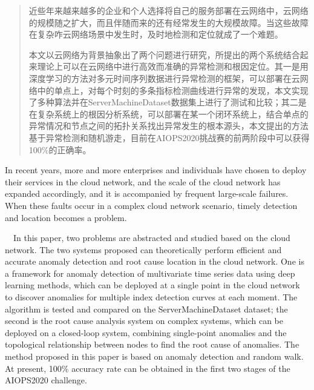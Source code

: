 

\begin{abstract}
  近些年来越来越多的企业和个人选择将自己的服务部署在云网络中，云网络的规模随之扩大，而且伴随而来的还有经常发生的大规模故障。当这些故障在复杂咋云网络场景中发生时，及时地检测和定位就成了一个难题。

  本文以云网络为背景抽象出了两个问题进行研究，所提出的两个系统结合起来理论上可以在云网络中进行高效而准确的异常检测和根因定位。其一是用深度学习的方法对多元时间序列数据进行异常检测的框架，可以部署在云网络中的单点上，对每个时刻的多条指标检测曲线进行异常的发现，本文实现了多种算法并在ServerMachineDataset\cite{su2019robust}数据集上进行了测试和比较；其二是在复杂系统上的根因分析系统，可以部署在某一个闭环系统上，结合单点的异常情况和节点之间的拓扑关系找出异常发生的根本源头，本文提出的方法基于异常检测和随机游走，目前在AIOPS2020挑战赛的前两阶段中可以获得100\%的正确率。

\end{abstract}

\begin{abstract*}
  In recent years, more and more enterprises and individuals have chosen to deploy their services in the cloud network, and the scale of the cloud network has expanded accordingly, and it is accompanied by frequent large-scale failures. When these faults occur in a complex cloud network scenario, timely detection and location becomes a problem.

  In this paper, two problems are abstracted and studied based on the cloud network. The two systems proposed can theoretically perform efficient and accurate anomaly detection and root cause location in the cloud network. One is a framework for anomaly detection of multivariate time series data using deep learning methods, which can be deployed at a single point in the cloud network to discover anomalies for multiple index detection curves at each moment. The algorithm is tested and compared on the ServerMachineDataset dataset; the second is the root cause analysis system on complex systems, which can be deployed on a closed-loop system, combining single-point anomalies and the topological relationship between nodes to find the root cause of anomalies. The method proposed in this paper is based on anomaly detection and random walk. At present, 100\% accuracy rate can be obtained in the first two stages of the AIOPS2020 challenge.
\end{abstract*}
